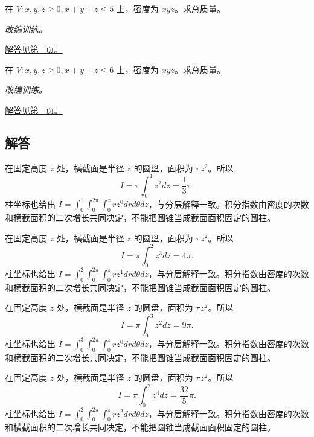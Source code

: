 \documentclass[UTF8,12pt,a4paper,fontset=fandol]{ctexart}
\begin{document}
\begin{example}[单纯形上的乘积密度]\label{ex:c39q23}
在 $V:x,y,z\ge0, x+y+z\le 5$ 上，密度为 $xyz$。求总质量。
\par\textit{改编训练。}\par\hyperref[ans:c39q23]{解答见第~\pageref{ans:c39q23} 页。}
\end{example}
\begin{example}[单纯形上的乘积密度]\label{ex:c39q24}
在 $V:x,y,z\ge0, x+y+z\le 6$ 上，密度为 $xyz$。求总质量。
\par\textit{改编训练。}\par\hyperref[ans:c39q24]{解答见第~\pageref{ans:c39q24} 页。}
\end{example}
\subsection{解答}
\begin{solve}\label{ans:c39q1}
在固定高度 $z$ 处，横截面是半径 $z$ 的圆盘，面积为 $\pi z^2$。所以
\[
I=\pi\int_0^{1}z^{2}dz=\frac{1}{3}\pi.
\]
柱坐标也给出 $I=\int_0^{1}\int_0^{2\pi}\int_0^zr z^{0}drd\theta dz$，与分层解释一致。积分指数由密度的次数和横截面积的二次增长共同决定，不能把圆锥当成截面面积固定的圆柱。
\end{solve}

\begin{solve}\label{ans:c39q2}
在固定高度 $z$ 处，横截面是半径 $z$ 的圆盘，面积为 $\pi z^2$。所以
\[
I=\pi\int_0^{2}z^{3}dz=4\pi.
\]
柱坐标也给出 $I=\int_0^{2}\int_0^{2\pi}\int_0^zr z^{1}drd\theta dz$，与分层解释一致。积分指数由密度的次数和横截面积的二次增长共同决定，不能把圆锥当成截面面积固定的圆柱。
\end{solve}

\begin{solve}\label{ans:c39q3}
在固定高度 $z$ 处，横截面是半径 $z$ 的圆盘，面积为 $\pi z^2$。所以
\[
I=\pi\int_0^{3}z^{2}dz=9\pi.
\]
柱坐标也给出 $I=\int_0^{3}\int_0^{2\pi}\int_0^zr z^{0}drd\theta dz$，与分层解释一致。积分指数由密度的次数和横截面积的二次增长共同决定，不能把圆锥当成截面面积固定的圆柱。
\end{solve}

\begin{solve}\label{ans:c39q4}
在固定高度 $z$ 处，横截面是半径 $z$ 的圆盘，面积为 $\pi z^2$。所以
\[
I=\pi\int_0^{2}z^{4}dz=\frac{32}{5}\pi.
\]
柱坐标也给出 $I=\int_0^{2}\int_0^{2\pi}\int_0^zr z^{2}drd\theta dz$，与分层解释一致。积分指数由密度的次数和横截面积的二次增长共同决定，不能把圆锥当成截面面积固定的圆柱。
\end{solve}
\end{document}
